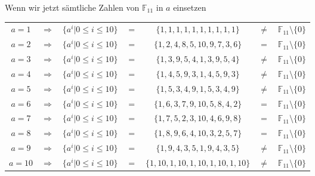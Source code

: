 Wenn wir jetzt sämtliche Zahlen von $\mathbb{F}_{11}$ in $a$ einsetzen
\begin{center}
\begin{tabular}{c c c c c c c}
$a = 1$ & $\Rightarrow$ & $\{a^i | 0 \le i \le 10\}$ & $=$ & $\{1, 1, 1, 1, 1, 1, 1, 1, 1, 1\}$ & $\neq$ & $\mathbb{F}_{11}\setminus\{0\}$ \\
$a = 2$ & $\Rightarrow$ & $\{a^i | 0 \le i \le 10\}$ & $=$ & $\{1, 2, 4, 8, 5, 10, 9, 7, 3, 6\}$ & $ = $ & $\mathbb{F}_{11}\setminus\{0\}$ \\
$a = 3$ & $\Rightarrow$ & $\{a^i | 0 \le i \le 10\}$ & $=$ & $\{1, 3, 9, 5, 4, 1, 3, 9, 5, 4\}$ & $\neq$ & $\mathbb{F}_{11}\setminus\{0\}$ \\
$a = 4$ & $\Rightarrow$ & $\{a^i | 0 \le i \le 10\}$ & $=$ & $\{1, 4, 5, 9, 3, 1, 4, 5, 9, 3\}$ & $\neq$ & $\mathbb{F}_{11}\setminus\{0\}$ \\
$a = 5$ & $\Rightarrow$ & $\{a^i | 0 \le i \le 10\}$ & $=$ & $\{1, 5, 3, 4, 9, 1, 5, 3, 4, 9\}$ & $\neq$ & $\mathbb{F}_{11}\setminus\{0\}$ \\
$a = 6$ & $\Rightarrow$ & $\{a^i | 0 \le i \le 10\}$ & $=$ & $\{1, 6, 3, 7, 9, 10, 5, 8, 4, 2\}$ & $ = $ & $\mathbb{F}_{11}\setminus\{0\}$ \\
$a = 7$ & $\Rightarrow$ & $\{a^i | 0 \le i \le 10\}$ & $=$ & $\{1, 7, 5, 2, 3, 10, 4, 6, 9, 8\}$ & $ = $ & $\mathbb{F}_{11}\setminus\{0\}$ \\
$a = 8$ & $\Rightarrow$ & $\{a^i | 0 \le i \le 10\}$ & $=$ & $\{1, 8, 9, 6, 4, 10, 3, 2, 5, 7\}$ & $ = $ & $\mathbb{F}_{11}\setminus\{0\}$ \\
$a = 9$ & $\Rightarrow$ & $\{a^i | 0 \le i \le 10\}$ & $=$ & $\{1, 9, 4, 3, 5, 1, 9, 4, 3, 5\}$ & $\neq$ & $\mathbb{F}_{11}\setminus\{0\}$ \\
$a = 10$ & $\Rightarrow$ & $\{a^i | 0 \le i \le 10\}$ & $=$ & $\{1, 10, 1, 10, 1, 10, 1, 10, 1, 10\}$ & $\neq$ & $\mathbb{F}_{11}\setminus\{0\}$ \\
\end{tabular}
\end{center}

